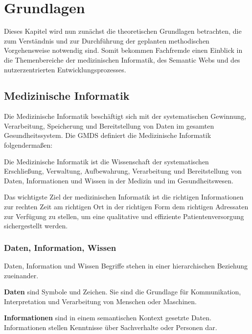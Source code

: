 \chapter{Grundlagen}\label{ch:preliminaries}

Dieses Kapitel wird nun zunächst die theoretischen Grundlagen betrachten, die zum Verständnis und zur Durchführung der geplanten methodischen Vorgehensweise notwendig sind.
Somit bekommen Fachfremde einen Einblick in die Themenbereiche der medizinischen Informatik, des Semantic Webs und des nutzerzentrierten Entwicklungsprozesses.

\section{Medizinische Informatik}\label{sec:mi}

Die Medizinische Informatik beschäftigt sich mit der systematischen Gewinnung, Verarbeitung, Speicherung und Bereitstellung von Daten im gesamten Gesundheitssystem. 
Die \ac{GMDS} definiert die Medizinische Informatik folgendermaßen:

\begin{definition}
	Die Medizinische Informatik ist die Wissenschaft der systematischen Erschließung, Verwaltung, Aufbewahrung, Verarbeitung und Bereitstellung von Daten, Informationen und 			Wissen in der Medizin und im Gesundheitswesen.
\end{definition}

Das wichtigste Ziel der medizinischen Informatik ist die richtigen Informationen zur rechten Zeit am richtigen Ort in der richtigen Form dem richtigen Adressaten zur Verfügung zu stellen, um eine qualitative und effiziente Patientenversorgung sichergestellt werden. \citep[vgl.]{winter_health_2011}

\subsection{Daten, Information, Wissen}

Daten, Information und Wissen Begriffe stehen in einer hierarchischen Beziehung zueinander.

\textbf{Daten} sind Symbole und Zeichen. Sie sind die Grundlage für Kommunikation, Interpretation und Verarbeitung von Menschen oder Maschinen.

\textbf{Informationen} sind in einem semantischen Kontext gesetzte Daten.
Informationen stellen Kenntnisse über Sachverhalte oder Personen dar.

